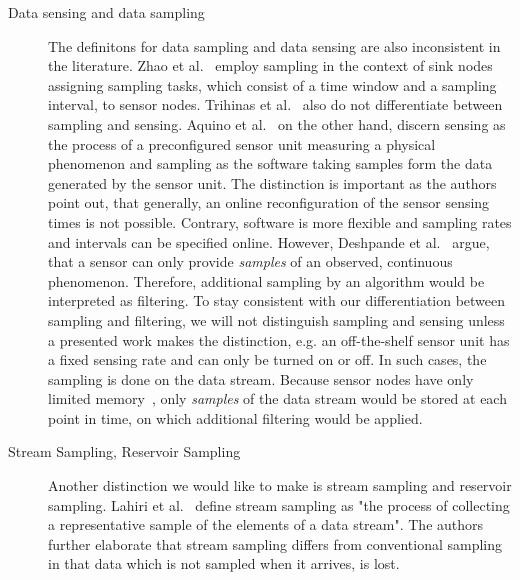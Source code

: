 \begin{description}
    \item[Data sensing and data sampling] 
        The definitons for data sampling and data sensing are also inconsistent
        in the literature. Zhao et al.~\cite{zhao2016cats} employ sampling in
        the context of sink nodes assigning sampling tasks, which consist of a
        time window and a sampling interval, to sensor nodes. Trihinas et
        al.~\cite{trihinas2015adam} also do not differentiate between sampling
        and sensing.  Aquino et al.~\cite{aquino2014musa} on the other hand,
        discern sensing as the process of a preconfigured sensor unit measuring
        a physical phenomenon and sampling as the software taking samples form
        the data generated by the sensor unit. The distinction is important as
        the authors point out, that generally, an online reconfiguration of the
        sensor sensing times is not possible. Contrary, software is more
        flexible and sampling rates and intervals can be specified online.
        However, Deshpande et al.~\cite{deshpande2004model} argue, that a
        sensor can only provide \textit{samples} of an observed, continuous
        phenomenon. Therefore, additional sampling by an algorithm would be
        interpreted as filtering. To stay consistent with our differentiation
        between sampling and filtering, we will not distinguish sampling and
        sensing unless a presented work makes the distinction, e.g. an
        off-the-shelf sensor unit has a fixed sensing rate and can only be
        turned on or off. In such cases, the sampling is done on the data
        stream. Because sensor nodes have only limited
        memory~\cite{akyildiz2002wireless}, only \textit{samples} of the data
        stream would be stored at each point in time, on which additional
        filtering would be applied. 

    \item[Stream Sampling, Reservoir Sampling]
        Another distinction we would like to make is stream sampling and
        reservoir sampling. Lahiri et al.~\cite{Lahiri2009} define stream
        sampling as "the process of collecting a representative sample of the
        elements of a data stream". The authors further elaborate that stream
        sampling differs from conventional sampling in that data which is not
        sampled when it arrives, is lost.



\end{description}
